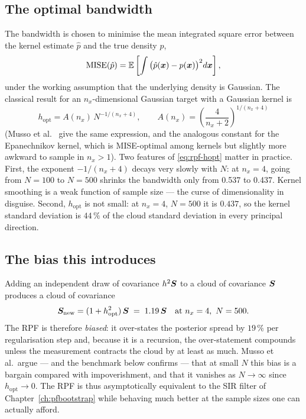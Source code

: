 \subsection{The optimal bandwidth}
The bandwidth is chosen to minimise the mean integrated square error between the kernel estimate
$\hat p$ and the true density $p$,
\begin{equation}
  \mathrm{MISE}(\hat p) = \mathbb{E}\left[\int \big(\hat p(\bm{x}) - p(\bm{x})\big)^2 d\bm{x}\right],
  \label{eq:rpf-mise}
\end{equation}
under the working assumption that the underlying density is Gaussian.  The classical result
\cite[\S4.3, eq.~(4.14)]{silverman1986} for an $n_x$-dimensional Gaussian target with a Gaussian
kernel is
\begin{equation}
  \boxed{\;
  h_{\mathrm{opt}} = A(n_x)\, N^{-1/(n_x+4)}, \qquad
  A(n_x) = \left(\frac{4}{n_x+2}\right)^{1/(n_x+4)} \; }
  \label{eq:rpf-hopt}
\end{equation}
(Musso et al.\ \cite[eq.~(15)]{musso2001regularized} give the same expression, and the analogous
constant for the Epanechnikov kernel, which is MISE-optimal among kernels but slightly more awkward
to sample in $n_x>1$).  Two features of \eqref{eq:rpf-hopt} matter in practice.  First, the
exponent $-1/(n_x+4)$ decays very slowly with $N$: at $n_x=4$, going from $N=100$ to $N=500$ shrinks
the bandwidth only from \num{0.537} to \num{0.437}.  Kernel smoothing is a weak function of sample
size --- the curse of dimensionality in disguise.  Second, $h_{\mathrm{opt}}$ is not small: at
$n_x=4$, $N=500$ it is $0.437$, so the kernel standard deviation is $44\,\%$ of the cloud standard
deviation in every principal direction.

\subsection{The bias this introduces}
Adding an independent draw of covariance $h^2\bm{S}$ to a cloud of covariance $\bm{S}$ produces a cloud of
covariance
\begin{equation}
  \bm{S}_{\mathrm{new}} = (1 + h_{\mathrm{opt}}^2)\,\bm{S}
  \;=\; 1.19\,\bm{S} \quad\text{at } n_x=4,\ N=500 .
  \label{eq:rpf-inflation}
\end{equation}
The RPF is therefore \emph{biased}: it over-states the posterior spread by $19\,\%$ per
regularisation step and, because it is a recursion, the over-statement compounds unless the
measurement contracts the cloud by at least as much.  Musso et al.\ argue --- and the benchmark
below confirms --- that at small $N$ this bias is a bargain compared with impoverishment, and that
it vanishes as $N\to\infty$ since $h_{\mathrm{opt}}\to 0$.  The RPF is thus asymptotically
equivalent to the SIR filter of Chapter~\ref{ch:pfbootstrap} while behaving much better at the
sample sizes one can actually afford.


